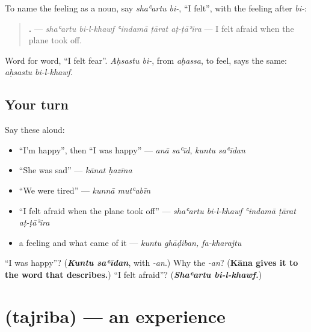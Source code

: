 \begin{grammarlens}[title={Grammar Lens: I felt}]
To name the feeling as a noun, say \emph{shaʿartu bi-}, \textquotedblleft{}I felt\textquotedblright{}, with the feeling after \emph{bi-}:

\begin{quote}
\textbf{    .} — \emph{shaʿartu bi-l-khawf ʿindamā ṭārat aṭ-ṭāʾira} — I felt afraid when the plane took off.
\end{quote}

Word for word, \textquotedblleft{}I felt fear\textquotedblright{}. \emph{Aḥsastu bi-}, from \emph{aḥassa}, to feel, says the same: \emph{aḥsastu bi-l-khawf}.
\end{grammarlens}

\subsection*{Your turn}
Say these aloud:

\begin{itemize}
\raggedright
  \item \textquotedblleft{}I'm happy\textquotedblright{}, then \textquotedblleft{}I was happy\textquotedblright{} — \emph{anā saʿīd}, \emph{kuntu saʿīdan}
  \item \textquotedblleft{}She was sad\textquotedblright{} — \emph{kānat ḥazīna}
  \item \textquotedblleft{}We were tired\textquotedblright{} — \emph{kunnā mutʿabīn}
  \item \textquotedblleft{}I felt afraid when the plane took off\textquotedblright{} — \emph{shaʿartu bi-l-khawf ʿindamā ṭārat aṭ-ṭāʾira}
  \item a feeling and what came of it — \emph{kuntu ghāḍiban, fa-kharajtu}
\end{itemize}

\begin{tcolorbox}[breakable,colback=teal!4,colframe=teal!35!black,title={Before you move on}]
\textquotedblleft{}I was happy\textquotedblright{}? (\emph{\textbf{Kuntu saʿīdan}}, with \emph{-an}.) Why the \emph{-an}? (\textbf{Kāna gives it to the word that describes.}) \textquotedblleft{}I felt afraid\textquotedblright{}? (\emph{\textbf{Shaʿartu bi-l-khawf.}})
\end{tcolorbox}
\section[\texorpdfstring{\ar{تجربة} (tajriba)}{تجربة (tajriba)}]{ (tajriba) — an experience}

